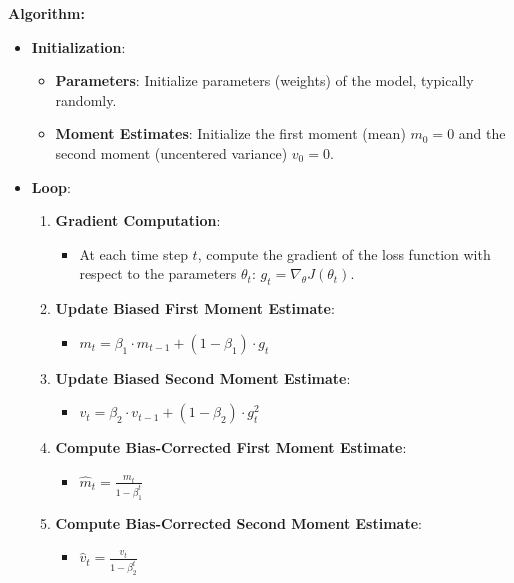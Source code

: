 \documentclass{article}
\begin{document}
\textbf{Algorithm:}
\begin{itemize}
    \item \textbf{Initialization}:
    \begin{itemize}
        \item \textbf{Parameters}: Initialize parameters (weights) of the model, typically randomly.
        \item \textbf{Moment Estimates}: Initialize the first moment (mean) $m_0 = 0$ and the second moment (uncentered variance) $v_0 = 0$.
    \end{itemize}

    \item \textbf{Loop}:
    \begin{enumerate}
  
        \item \textbf{Gradient Computation}:
        \begin{itemize}
            \item At each time step $t$, compute the gradient of the loss function with respect to the parameters $\theta_t$: $g_t = \nabla_{\theta} J(\theta_t)$.
        \end{itemize}
    
        \item \textbf{Update Biased First Moment Estimate}:
        \begin{itemize}
            \item $m_t = \beta_1 \cdot m_{t-1} + (1 - \beta_1) \cdot g_t$
        \end{itemize}
    
        \item \textbf{Update Biased Second Moment Estimate}:
        \begin{itemize}
            \item $v_t = \beta_2 \cdot v_{t-1} + (1 - \beta_2) \cdot g_t^2$
        \end{itemize}
    
        \item \textbf{Compute Bias-Corrected First Moment Estimate}:
        \begin{itemize}
            \item $\hat{m}_t = \frac{m_t}{1 - \beta_1^t}$
        \end{itemize}
    
        \item \textbf{Compute Bias-Corrected Second Moment Estimate}:
        \begin{itemize}
            \item $\hat{v}_t = \frac{v_t}{1 - \beta_2^t}$
        \end{itemize}
    

\end{enumerate}
\end{itemize}
\end{document}
